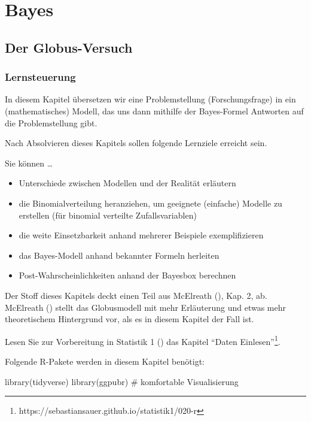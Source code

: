 \documentclass[
  ngerman,
  letterpaper,
  twoside,
  open=any]{scrbook}
\newenvironment{Shaded}{\begin{snugshade}}{\end{snugshade}}
\newcommand{\CommentTok}[1]{\textcolor[rgb]{0.37,0.37,0.37}{#1}}
\newcommand{\FunctionTok}[1]{\textcolor[rgb]{0.28,0.35,0.67}{#1}}
\newcommand{\NormalTok}[1]{\textcolor[rgb]{0.00,0.23,0.31}{#1}}
\providecommand{\tightlist}{%
  \setlength{\itemsep}{0pt}\setlength{\parskip}{0pt}}\usepackage{longtable,booktabs,array}
\theoremstyle{definition}
\theoremstyle{plain}
\theoremstyle{definition}
\theoremstyle{definition}
\theoremstyle{definition}
\theoremstyle{definition}
\theoremstyle{remark}
\begin{document}
\part{Bayes}

\chapter{Der Globus-Versuch}\label{der-globus-versuch}

\section{Lernsteuerung}\label{lernsteuerung-5}

In diesem Kapitel übersetzen wir eine Problemstellung (Forschungsfrage)
in ein (mathematisches) Modell, das uns dann mithilfe der Bayes-Formel
Antworten auf die Problemstellung gibt.

Nach Absolvieren dieses Kapitels sollen folgende Lernziele erreicht
sein.

Sie können \ldots{}

\begin{itemize}
\tightlist
\item
  Unterschiede zwischen Modellen und der Realität erläutern
\item
  die Binomialverteilung heranziehen, um geeignete (einfache) Modelle zu
  erstellen (für binomial verteilte Zufallsvariablen)
\item
  die weite Einsetzbarkeit anhand mehrerer Beispiele exemplifizieren
\item
  das Bayes-Modell anhand bekannter Formeln herleiten
\item
  Post-Wahrscheinlichkeiten anhand der Bayesbox berechnen
\end{itemize}

Der Stoff dieses Kapitels deckt einen Teil aus McElreath
(), Kap. 2, ab. McElreath
() stellt das Globusmodell mit mehr
Erläuterung und etwas mehr theoretischem Hintergrund vor, als es in
diesem Kapitel der Fall ist.

Lesen Sie zur Vorbereitung in Statistik 1
() das Kapitel \enquote{Daten
Einlesen}\footnote{https://sebastiansauer.github.io/statistik1/020-r}.

Folgende R-Pakete werden in diesem Kapitel benötigt:

\begin{Shaded}
\begin{Highlighting}[]
\FunctionTok{library}\NormalTok{(tidyverse)}
\FunctionTok{library}\NormalTok{(ggpubr)  }\CommentTok{\# komfortable Visualisierung}
\end{Highlighting}
\end{Shaded}
\end{document}
